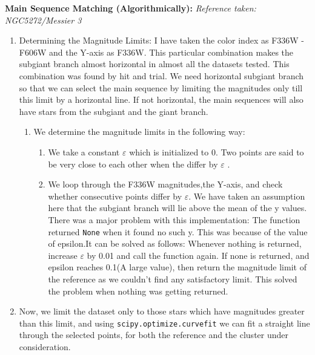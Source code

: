 \documentclass{article}
\begin{document}
\textbf{\Large Main Sequence Matching (Algorithmically):}\newline
\textit{Reference taken: NGC5272/Messier 3 }
\begin{enumerate}
    \item Determining the Magnitude Limits:\newline
    I have taken the color index as F336W - F606W and the Y-axis as F336W.
    This particular combination makes the subgiant branch almost horizontal in almost all the datasets tested. This combination was found by hit and trial.
    We need horizontal subgiant branch so that we can select the main sequence by limiting the magnitudes only till this limit by a horizontal line. If not horizontal, the main sequences will also have stars from the subgiant and the giant branch.
    \begin{enumerate}
        \item We determine the magnitude limits in the following way:\newline
        \begin{enumerate}
            \item We take a constant $\varepsilon$ which is initialized to 0. Two points are said to be very close to each other when the differ by $\varepsilon$ .
            \item We loop through the F336W magnitudes,the Y-axis, and check whether consecutive points differ by $\varepsilon$.
            We have taken an assumption here that the subgiant branch will lie above the mean of the y values.\newline
            There was a major problem with this implementation: The function returned {\tt None} when it found no such y. This was because of the value of epsilon.It can be solved as follows:\newline
            Whenever nothing is returned, increase $\varepsilon$ by 0.01 and call the function again. If none is returned, and epsilon reaches 0.1(A large value), then return the magnitude limit of the reference as we couldn't find any satisfactory limit.\newline
            This solved the problem when nothing was getting returned.
            \end{enumerate}
    \end{enumerate}
    \item Now, we limit the dataset only to those stars which have magnitudes greater than this limit, and using {\tt scipy.optimize.curve\textunderscore fit} we can fit a straight line through the selected points, for both the reference and the cluster under consideration.

\end{enumerate}
\end{document}
